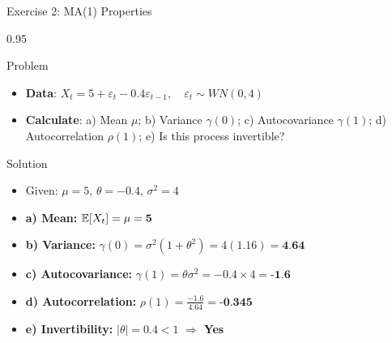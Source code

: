 \documentclass[9pt, aspectratio=169, t]{beamer}
\begin{document}
\begin{frame}{Exercise 2: MA(1) Properties}
    \begin{cminipage}{0.95\textwidth}
    \begin{alertblock}{Problem}
        \begin{itemize}\setlength{\itemsep}{0pt}
            \item \textbf{Data}: $X_t = 5 + \varepsilon_t - 0.4\varepsilon_{t-1}, \quad \varepsilon_t \sim WN(0, 4)$
            \item \textbf{Calculate}: a) Mean $\mu$; b) Variance $\gamma(0)$; c) Autocovariance $\gamma(1)$; d) Autocorrelation $\rho(1)$; e) Is this process invertible?
        \end{itemize}
    \end{alertblock}

    \vspace{0.2cm}
    \begin{exampleblock}{Solution}
        \begin{itemize}\setlength{\itemsep}{0pt}
            \item Given: $\mu = 5$, $\theta = -0.4$, $\sigma^2 = 4$
            \item \textbf{a) Mean:} $\mathbb{E}[X_t] = \mu = \textbf{5}$
            \item \textbf{b) Variance:} $\gamma(0) = \sigma^2(1 + \theta^2) = 4(1.16) = \textbf{4.64}$
            \item \textbf{c) Autocovariance:} $\gamma(1) = \theta\sigma^2 = -0.4 \times 4 = \textbf{-1.6}$
            \item \textbf{d) Autocorrelation:} $\rho(1) = \frac{-1.6}{4.64} = \textbf{-0.345}$
            \item \textbf{e) Invertibility:} $|\theta| = 0.4 < 1$ $\Rightarrow$ \textcolor{Forest}{\textbf{Yes}}
        \end{itemize}
    \end{exampleblock}
    \end{cminipage}
\end{frame}
\end{document}
